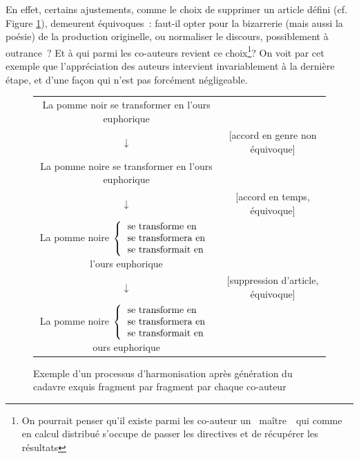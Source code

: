\documentclass{article}
\begin{document}
				En effet, certains ajustements, comme le choix de supprimer un article défini (cf. Figure \ref{fig:consensus}), demeurent équivoques~: faut-il opter pour la bizarrerie (mais aussi la poésie) de la production originelle, ou normaliser le discours, possiblement à outrance~? Et à qui parmi les co-auteurs revient ce choix\footnote{On pourrait penser qu'il existe parmi les co-auteur un \guillemotleft~maître~\guillemotright~qui comme en calcul distribué s'occupe de passer les directives et de récupérer les résultats}? On voit par cet exemple que l'appréciation des auteurs intervient invariablement à la dernière étape, et d'une façon qui n'est pas forcément négligeable.\\
				
				\begin{figure}[H]
					\begin{tabular}{c c}
						La pomme noir se transformer en l'ours euphorique & \\
						$\downarrow$ & [accord en genre non équivoque] \\
						La pomme noire se transformer en l'ours euphorique & \\
						$\downarrow$ & [accord en temps, équivoque]\\
						La pomme noire $\left\lbrace\begin{tabular}{l}
						se transforme en\\
						se transformera en\\
						se transformait en\\
						\end{tabular}\right.$
						l'ours euphorique & \\
						$\downarrow$ & [suppression d'article, équivoque]\\
						La pomme noire 
						$\left\lbrace\begin{tabular}{l}
						se transforme en\\
						se transformera en\\
						se transformait en\\
						\end{tabular}\right.$ ours euphorique & \\
					\end{tabular}
					\caption{Exemple d'un processus d'harmonisation après génération du cadavre exquis fragment par fragment par chaque co-auteur}
					\label{fig:consensus}
				\end{figure}
				
\end{document}
